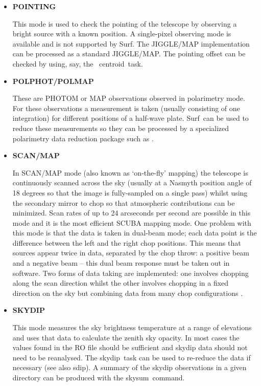 \documentclass[twoside,11pt]{article}
\newcommand{\scusoft}          {{\sc Surf}}
\newcommand{\Kappa}{\xref{{\sc{Kappa}}}{sun95}{}}
\newcommand{\polpack}{\xref{{\sc{Polpack}}}{sun223}{}}
\newcommand{\task}[1]{{\sf #1}}
\newcommand{\skydip}{\htmlref{\task{skydip}}{SKYDIP}}
\newcommand{\skysum}{\htmlref{\task{skysum}}{SKYSUM}}
\newcommand{\sdip}{\htmlref{\task{sdip}}{SDIP}}
\newcommand{\centroid}{\xref{\task{centroid}}{sun95}{CENTROID}}
\newcommand{\htmlref}[2]{#1}
\newcommand{\xref}[3]{#1}
\renewcommand{\_}{\texttt{\symbol{95}}}
\begin{document}
\begin{itemize}
\item {\bf POINTING}

This mode is used to check the pointing of the telescope by observing a bright
source with a known position. A single-pixel observing mode is available and
is not supported by \scusoft. The JIGGLE/MAP implementation can be processed
as a standard JIGGLE/MAP. The pointing offset can be checked by using, say,
the \Kappa\ \centroid\ task.

\item {\bf POLPHOT/POLMAP}

These are PHOTOM or MAP observations observed in polarimetry mode.
For these observations a measurement is taken (usually consisting
of one integration) for different positions of a half-wave plate.
\scusoft\ can be used to reduce these measurements so they can
be processed by a specialized polarimetry data reduction package
such as \polpack.

\item {\bf SCAN/MAP}

In SCAN/MAP mode (also known as `on-the-fly' mapping) the telescope is
continuously scanned across the sky (usually at a Nasmyth position angle of 18
degrees so that the image is fully-sampled on a single pass) whilst using the
secondary mirror to chop so that atmospheric 
contributions can be minimized. Scan rates of up to 24 arcseconds per second
are possible in this mode and it is the most efficient SCUBA mapping mode.
One problem with this mode is that the data is taken in dual-beam mode; each
data point is the difference between the left and the right chop positions.
This means that sources appear twice in data, separated by the chop throw:
a positive beam and a negative beam -- this dual beam response must
be taken out in software. Two forms of data taking are implemented: one
involves chopping along the scan direction \cite{ekh} whilst the
other involves chopping in a fixed direction on the sky but combining
data from many chop configurations \cite{EII,spietj}.

\item {\bf SKYDIP}

This mode measures the sky brightness temperature at a range of elevations and
uses that data to calculate the zenith sky opacity. In most cases the values
found in the RO file should be sufficient and skydip data should not need to
be reanalysed.  The \skydip\ task can be used to re-reduce the data
if necessary (see also \sdip). A summary of the skydip observations in a given 
directory can be produced with the \skysum\ command.

\end{itemize}
\end{document}
